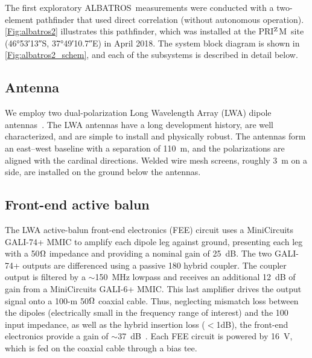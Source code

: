 \documentclass{ws-jai}
\def\albatros{ALBATROS}
\def\prizm{PRI$^{\rm Z}$M}
\begin{document}
The first exploratory \albatros\ measurements were conducted with a
two-element pathfinder that used direct correlation (without
autonomous operation).  \autoref{Fig:albatros2} illustrates this
pathfinder, which was installed at the \prizm\ site (\ang{46;53;13}S,
\ang{37;49;10.7}E) in April 2018.  The system block diagram is shown
in \autoref{Fig:albatros2_schem}, and each of the subsystems is
described in detail below.

\subsection{Antenna}\label{s:antenna}

We employ two dual-polarization Long Wavelength Array (LWA) dipole
antennas~\citep{Memo28}.  The LWA antennas have a long development
history, are well characterized, and are simple to install and
physically robust.  The antennas form an east--west baseline with a
separation of \SI{110}{m}, and the polarizations are aligned with the
cardinal directions.  Welded wire mesh screens, roughly 3~m on a side,
are installed on the ground below the antennas.

\subsection{Front-end active balun}\label{s:fee}

The LWA active-balun front-end electronics (FEE) circuit uses a
MiniCircuits GALI-74+ MMIC to amplify each dipole leg against ground,
presenting each leg with a 50$\ohm$ impedance and providing a nominal
gain of 25~dB. The two GALI-74+ outputs are differenced using a
passive {180\degree} hybrid coupler. The coupler output is filtered by
a $\sim$150~MHz lowpass and receives an additional 12~dB of gain from
a MiniCircuits GALI-6+ MMIC. This last amplifier drives the output
signal onto a 100-m 50$\ohm$ coaxial cable. Thus, neglecting mismatch
loss between the dipoles (electrically small in the frequency range of
interest) and the 100{\ohm} input impedance, as well as the hybrid
insertion loss ($<$1dB), the front-end electronics provide a gain of
$\sim$37~dB~\citep{2012PASP..124.1090H}.  Each FEE circuit is powered
by 16~V, which is fed on the coaxial cable through a bias tee.

\end{document}

